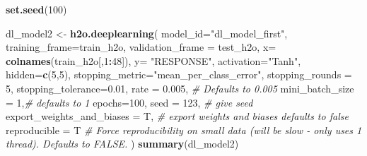 \documentclass[]{article}
\newenvironment{Shaded}{\begin{snugshade}}{\end{snugshade}}
\newcommand{\KeywordTok}[1]{\textcolor[rgb]{0.13,0.29,0.53}{\textbf{#1}}}
\newcommand{\DataTypeTok}[1]{\textcolor[rgb]{0.13,0.29,0.53}{#1}}
\newcommand{\DecValTok}[1]{\textcolor[rgb]{0.00,0.00,0.81}{#1}}
\newcommand{\FloatTok}[1]{\textcolor[rgb]{0.00,0.00,0.81}{#1}}
\newcommand{\StringTok}[1]{\textcolor[rgb]{0.31,0.60,0.02}{#1}}
\newcommand{\CommentTok}[1]{\textcolor[rgb]{0.56,0.35,0.01}{\textit{#1}}}
\newcommand{\OperatorTok}[1]{\textcolor[rgb]{0.81,0.36,0.00}{\textbf{#1}}}
\newcommand{\NormalTok}[1]{#1}
\begin{document}
\begin{Shaded}
\begin{Highlighting}[]
\KeywordTok{set.seed}\NormalTok{(}\DecValTok{100}\NormalTok{)}

\NormalTok{dl_model2 <-}\StringTok{ }\KeywordTok{h2o.deeplearning}\NormalTok{(}
  \DataTypeTok{model_id=}\StringTok{"dl_model_first"}\NormalTok{, }
  \DataTypeTok{training_frame=}\NormalTok{train_h2o, }
  \DataTypeTok{validation_frame =}\NormalTok{ test_h2o,}
  \DataTypeTok{x=} \KeywordTok{colnames}\NormalTok{(train_h2o[,}\DecValTok{1}\OperatorTok{:}\DecValTok{48}\NormalTok{]),}
  \DataTypeTok{y=} \StringTok{"RESPONSE"}\NormalTok{,}
  \DataTypeTok{activation=}\StringTok{"Tanh"}\NormalTok{,  }
  \DataTypeTok{hidden=}\KeywordTok{c}\NormalTok{(}\DecValTok{5}\NormalTok{,}\DecValTok{5}\NormalTok{), }
  \DataTypeTok{stopping_metric=}\StringTok{"mean_per_class_error"}\NormalTok{,}
  \DataTypeTok{stopping_rounds =} \DecValTok{5}\NormalTok{,}
  \DataTypeTok{stopping_tolerance=}\FloatTok{0.01}\NormalTok{,}
  \DataTypeTok{rate =} \FloatTok{0.005}\NormalTok{, }\CommentTok{# Defaults to 0.005}
  \DataTypeTok{mini_batch_size =} \DecValTok{1}\NormalTok{,}\CommentTok{# defaults to 1 }
  \DataTypeTok{epochs=}\DecValTok{100}\NormalTok{,}
  \DataTypeTok{seed =} \DecValTok{123}\NormalTok{, }\CommentTok{# give seed }
  \DataTypeTok{export_weights_and_biases =}\NormalTok{ T, }\CommentTok{# export weights and biases defaults to false}
  \DataTypeTok{reproducible =}\NormalTok{ T }\CommentTok{# Force reproducibility on small data (will be slow - only uses 1 thread). Defaults to FALSE.}
\NormalTok{)}
\KeywordTok{summary}\NormalTok{(dl_model2)}
\end{Highlighting}
\end{Shaded}
\end{document}
